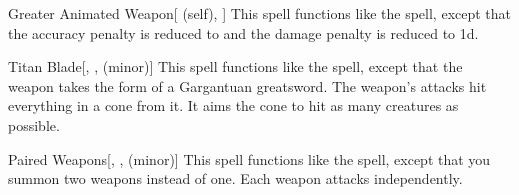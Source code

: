 \lowercase{\hypertarget{spell:Greater Animated Weapon}{}}\label{spell:Greater Animated Weapon}
\begin{attuneability}[Rank 7]{\hypertarget{spell:Greater Animated Weapon}{Greater Animated Weapon}}[ (self), ]
This spell functions like the  spell, except that the accuracy penalty is reduced to  and the damage penalty is reduced to \minus1d.
\end{attuneability}
\vspace{0.25em}



\lowercase{\hypertarget{spell:Titan Blade}{}}\label{spell:Titan Blade}
\begin{freeability}[Rank 7]{\hypertarget{spell:Titan Blade}{Titan Blade}}[, ,  (minor)]
This spell functions like the  spell, except that the weapon takes the form of a Gargantuan greatsword.
The weapon's attacks hit everything in a \areamed cone from it.
It aims the cone to hit as many creatures as possible.
\end{freeability}
\vspace{0.25em}



\lowercase{\hypertarget{spell:Paired Weapons}{}}\label{spell:Paired Weapons}
\begin{freeability}[Rank 8]{\hypertarget{spell:Paired Weapons}{Paired Weapons}}[, ,  (minor)]
This spell functions like the  spell, except that you summon two weapons instead of one.
Each weapon attacks independently.
\end{freeability}
\vspace{0.25em}


